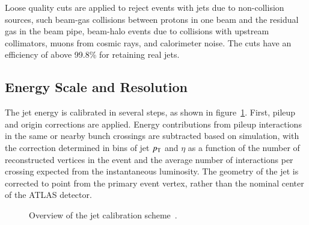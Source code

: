 Loose quality cuts are applied to reject events with jets due to non-collision sources, such beam-gas collisions between protons in one beam and the residual gas in the beam pipe, beam-halo events due to collisions with upstream collimators, muons from cosmic rays, and calorimeter noise. The cuts have an efficiency of above 99.8\% for retaining real jets. 


\subsection{Energy Scale and Resolution}\label{sec:reco-jets-energy-scale-resolution}
The jet energy is calibrated in several steps, as shown in figure~\ref{fig:reco-jet-calibration-flowchart}. First, pileup and origin corrections are applied. Energy contributions from pileup interactions in the same or nearby bunch crossings are subtracted based on simulation, with the correction determined in bins of jet $p_{\text{T}}$ and $\eta$ as a function of the number of reconstructed vertices in the event and the average number of interactions per crossing expected from the instantaneous luminosity. 
The geometry of the jet is corrected to point from the primary event vertex, rather than the nominal center of the ATLAS detector. 

\begin{figure}[htbp]
	\centering
	\caption{Overview of the jet calibration scheme~\cite{TheATLASCollaboration:2015ds}. }
	\label{fig:reco-jet-calibration-flowchart}
\end{figure}


